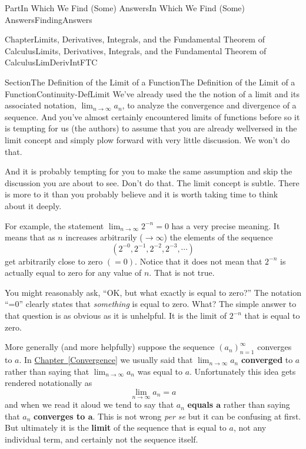 \documentclass[oneside,10pt,]{book}
\newcommand{\xreffont}{\relax}
\newcommand{\terminology}[1]{\textbf{#1}}
\numberwithin{equation}{part}
\def\limit#1#2#3{{\displaystyle\lim_{#1\rightarrow #2}#3}}
\begin{document}
\begin{partptx}{Part}{In Which We Find (Some) Answers}{}{In Which We Find (Some) Answers}{}{}{FindingAnswers}
\begin{chapterptx}{Chapter}{Limits, Derivatives, Integrals, and the Fundamental Theorem of Calculus}{}{Limits, Derivatives, Integrals, and the Fundamental Theorem of Calculus}{}{}{LimDerivIntFTC}
\begin{sectionptx}{Section}{The Definition of the Limit of a Function}{}{The Definition of the Limit of a Function}{}{}{Continuity-DefLimit}
We've already used the the notion of a limit and its associated notation, \(\limit{n}{\infty}{a_n}\), to analyze the convergence and divergence of a sequence. And you've almost certainly encountered limits of functions before so it is tempting for us (the authors) to assume that you are already well\textendash{}versed in the limit concept and simply plow forward with very little discussion. We won't do that.%
\par
And it is probably tempting for you to make the same assumption and skip the discussion you are about to see. Don't do that. The limit concept is subtle. There is more to it than you probably believe and it is worth taking time to think about it deeply.%
\par
For example, the statement \(\limit{n}{\infty}{2^{-n}}=0\) has a very precise meaning. It means that as \(n\) increases arbitrarily (\(\rightarrow \infty \)) the elements of the sequence%
\begin{equation*}
\left(2^{-0}, 2^{-1}, 2^{-2}, 2^{-3},
\cdots{}\right)
\end{equation*}
get arbitrarily close to zero \((=0)\). Notice that it does not mean that \(2^{-n}\) is actually equal to zero for any value of \(n\). That is not true.%
\par
You might reasonably ask, ``OK, but what exactly is equal to zero?'' The notation ``=0'' clearly states that \emph{something} is equal to zero. What? The simple answer to that question is as obvious as it is unhelpful.  It is the limit of \(2^{-n}\) that is equal to zero.%
\par
More generally (and more helpfully) suppose the sequence \(\left(a_n\right)_{n=1}^\infty \) converges to \(a\).  In \hyperref[Convergence]{Chapter~{\xreffont\ref{Convergence}}} we usually said that \(\limit{n}{\infty}{a_n}\) \terminology{converged} to \(a\) rather than saying that \(\limit{n}{\infty}{a_n}\) was equal to \(a\). Unfortunately this idea gets rendered notationally as%
\begin{equation*}
\limit{n}{\infty}{a_n}=a 
\end{equation*}
and when we read it aloud we tend to say that \(a_n\) \terminology{equals \(\boldsymbol{a}\)} rather than saying that \(a_n\) \terminology{converges to \(\boldsymbol{a}\)}. This is not wrong \textit{per se} but it can be confusing at first. But ultimately it is the \terminology{limit} of the sequence that is equal to \(a\), not any individual term, and certainly not the sequence itself.%
\par

\end{sectionptx}
\end{chapterptx}
\end{partptx}
\end{document}
